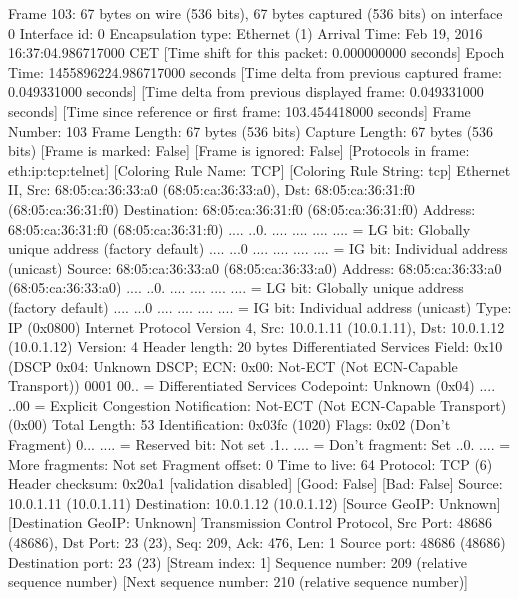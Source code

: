 Frame 103: 67 bytes on wire (536 bits), 67 bytes captured (536 bits) on interface 0
    Interface id: 0
    Encapsulation type: Ethernet (1)
    Arrival Time: Feb 19, 2016 16:37:04.986717000 CET
    [Time shift for this packet: 0.000000000 seconds]
    Epoch Time: 1455896224.986717000 seconds
    [Time delta from previous captured frame: 0.049331000 seconds]
    [Time delta from previous displayed frame: 0.049331000 seconds]
    [Time since reference or first frame: 103.454418000 seconds]
    Frame Number: 103
    Frame Length: 67 bytes (536 bits)
    Capture Length: 67 bytes (536 bits)
    [Frame is marked: False]
    [Frame is ignored: False]
    [Protocols in frame: eth:ip:tcp:telnet]
    [Coloring Rule Name: TCP]
    [Coloring Rule String: tcp]
Ethernet II, Src: 68:05:ca:36:33:a0 (68:05:ca:36:33:a0), Dst: 68:05:ca:36:31:f0 (68:05:ca:36:31:f0)
    Destination: 68:05:ca:36:31:f0 (68:05:ca:36:31:f0)
        Address: 68:05:ca:36:31:f0 (68:05:ca:36:31:f0)
        .... ..0. .... .... .... .... = LG bit: Globally unique address (factory default)
        .... ...0 .... .... .... .... = IG bit: Individual address (unicast)
    Source: 68:05:ca:36:33:a0 (68:05:ca:36:33:a0)
        Address: 68:05:ca:36:33:a0 (68:05:ca:36:33:a0)
        .... ..0. .... .... .... .... = LG bit: Globally unique address (factory default)
        .... ...0 .... .... .... .... = IG bit: Individual address (unicast)
    Type: IP (0x0800)
Internet Protocol Version 4, Src: 10.0.1.11 (10.0.1.11), Dst: 10.0.1.12 (10.0.1.12)
    Version: 4
    Header length: 20 bytes
    Differentiated Services Field: 0x10 (DSCP 0x04: Unknown DSCP; ECN: 0x00: Not-ECT (Not ECN-Capable Transport))
        0001 00.. = Differentiated Services Codepoint: Unknown (0x04)
        .... ..00 = Explicit Congestion Notification: Not-ECT (Not ECN-Capable Transport) (0x00)
    Total Length: 53
    Identification: 0x03fc (1020)
    Flags: 0x02 (Don't Fragment)
        0... .... = Reserved bit: Not set
        .1.. .... = Don't fragment: Set
        ..0. .... = More fragments: Not set
    Fragment offset: 0
    Time to live: 64
    Protocol: TCP (6)
    Header checksum: 0x20a1 [validation disabled]
        [Good: False]
        [Bad: False]
    Source: 10.0.1.11 (10.0.1.11)
    Destination: 10.0.1.12 (10.0.1.12)
    [Source GeoIP: Unknown]
    [Destination GeoIP: Unknown]
Transmission Control Protocol, Src Port: 48686 (48686), Dst Port: 23 (23), Seq: 209, Ack: 476, Len: 1
    Source port: 48686 (48686)
    Destination port: 23 (23)
    [Stream index: 1]
    Sequence number: 209    (relative sequence number)
    [Next sequence number: 210    (relative sequence number)]
